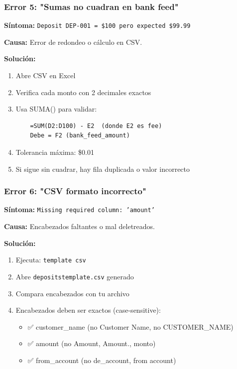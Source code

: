 \documentclass[12pt,oneside]{article}
\begin{document}
\subsubsection{Error 5: "Sumas no cuadran en bank feed"}

\textbf{Síntoma:} \texttt{Deposit DEP-001 = \$100 pero expected \$99.99}

\textbf{Causa:} Error de redondeo o cálculo en CSV.

\textbf{Solución:}
\begin{enumerate}
    \item Abre CSV en Excel
    \item Verifica cada monto con 2 decimales exactos
    \item Usa SUMA() para validar:
    \begin{verbatim}
    =SUM(D2:D100) - E2  (donde E2 es fee)
    Debe = F2 (bank_feed_amount)
    \end{verbatim}
    \item Tolerancia máxima: \$0.01
    \item Si sigue sin cuadrar, hay fila duplicada o valor incorrecto
\end{enumerate}

\subsubsection{Error 6: "CSV formato incorrecto"}

\textbf{Síntoma:} \texttt{Missing required column: 'amount'}

\textbf{Causa:} Encabezados faltantes o mal deletreados.

\textbf{Solución:}
\begin{enumerate}
    \item Ejecuta: \texttt{template csv}
    \item Abre \texttt{depositstemplate.csv} generado
    \item Compara encabezados con tu archivo
    \item Encabezados deben ser exactos (case-sensitive):
    \begin{itemize}
        \item ✅ customer\_name (no Customer Name, no CUSTOMER\_NAME)
        \item ✅ amount (no Amount, Amount., monto)
        \item ✅ from\_account (no de\_account, from account)
    \end{itemize}
\end{enumerate}
\end{document}
